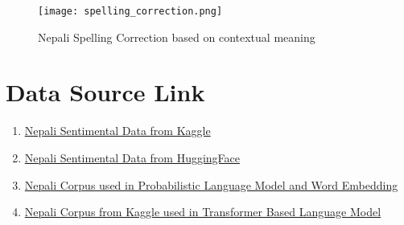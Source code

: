 \begin{figure}[H]
    \centering
    \texttt{[image: spelling\_correction.png]}
    \caption{Nepali Spelling Correction based on contextual meaning}
    \label{fig:Nepali Spelling Correction}
\end{figure}

\section{Data Source Link}
\begin{enumerate}
    \item \href{https://www.kaggle.com/datasets/smaheshacharya/nepali-sentiment-analysis}{Nepali Sentimental Data from Kaggle}
    \item \href{https://huggingface.co/rockerritesh/NepaliSentiment/tree/main}{Nepali Sentimental Data from HuggingFace}
    \item \href{https://github.com/ashmitbhattarai/Nepali-Language-Modeling-Using-LSTM/tree/master/Nepali_Corpus}{Nepali Corpus used in Probabilistic Language Model and Word Embedding}
    \item \href{https://www.kaggle.com/datasets/rajanghimire/nepdata}{Nepali Corpus from Kaggle used in Transformer Based Language Model}
\end{enumerate}